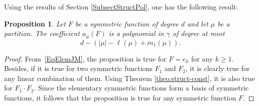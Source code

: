 \documentclass[11pt]{amsart}
\theoremstyle{plain}
\newtheorem{proposition}[lemma]{Proposition}
\theoremstyle{remark}
\begin{document}
Using the results of Section \ref{SubsectStructPol}, one has the following result:
\begin{proposition}\label{PropDegJM}
    Let $F$ be a symmetric function of degree $d$ and let $\mu$ be a partition.
    The coefficient $a_\mu(F)$ is a polynomial in $\gamma$ of degree at most
    $$d - (|\mu|-\ell(\mu)+m_1(\mu)).$$
\end{proposition}
\begin{proof}
    From~\eqref{EqElemJM}, the proposition is true for $F=e_k$ for any $k\geq 1$.
    Besides, if it is true for two symmetric functions $F_1$ and $F_2$, it is
clearly true for any linear combination
    of them.
    Using Theorem \ref{theo:struct-const}, it is also true for $F_1 \cdot F_2$.
    Since the elementary symmetric functions form a basis of symmetric functions, 
    it follows that the proposition is true for any symmetric function $F$.
\end{proof}
\end{document}

